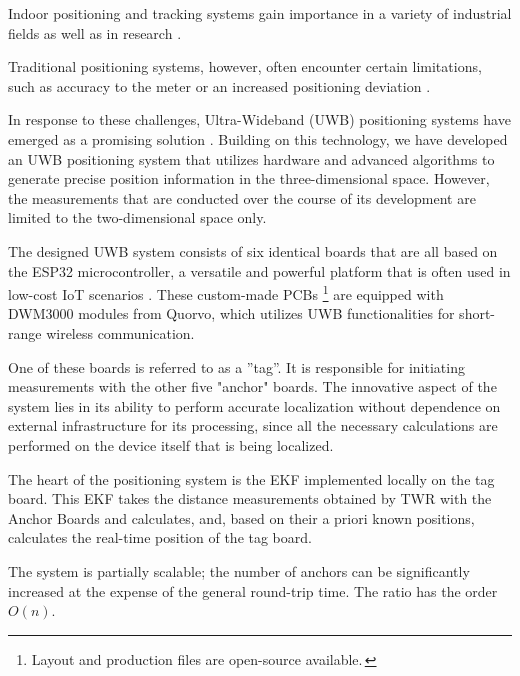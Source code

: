 \documentclass[conference, a4paper]{IEEEtran}
\begin{document}
Indoor positioning and tracking systems gain importance in a variety of industrial fields as well as in research \cite{LiFi_Positioning} \cite{Accelerometer_Positioning} \cite{UWB_Positioning} \cite{UWB_Positioning2}.

Traditional positioning systems, however, often encounter certain limitations, such as accuracy to the meter \cite{LiFi_Positioning} or an increased positioning deviation \cite{Accelerometer_Positioning}. 

In response to these challenges, Ultra-Wideband (UWB) positioning systems have emerged as a promising solution \cite{UWB_Positioning} \cite{UWB_Positioning2}.
Building on this technology, we have developed an \ac{UWB} positioning system that utilizes hardware and advanced algorithms to generate precise position information in the three-dimensional space. However, the measurements that are conducted over the course of its development are limited to the two-dimensional space only. 

The designed \ac{UWB} system consists of six identical boards that are all based on the ESP32 microcontroller, a versatile and powerful platform that is often used in low-cost \ac{IoT} scenarios \cite{ESP32}. 
These custom-made \acp{PCB} \footnote{Layout and production files are open-source available.\,\cite{uwb-tracking}} are equipped with DWM3000 modules from Quorvo, which utilizes \ac{UWB} functionalities for short-range wireless communication.

One of these boards is referred to as a ''tag''.
It is responsible for initiating measurements with the other five "anchor" boards.
The innovative aspect of the system lies in its ability to perform accurate localization without dependence on external infrastructure for its processing,
since all the necessary calculations are performed on the device itself that is being localized.

The heart of the positioning system is the \acf{EKF} implemented locally on the tag board.
This \ac{EKF} takes the distance measurements obtained by \acf{TWR} with the Anchor Boards and calculates,
and, based on their a priori known positions, calculates the real-time position of the tag board.

The system is partially scalable; the number of anchors can be significantly increased at
the expense of the general round-trip time. The ratio has the order $O(n)$.
\end{document}

